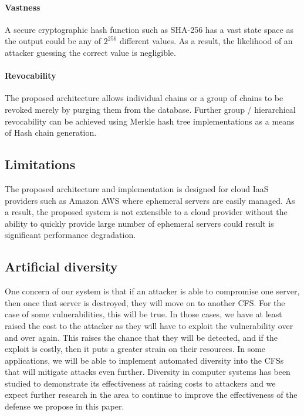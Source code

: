 \documentclass[a4paper,twoside]{article}
\begin{document}
\paragraph*{Vastness} A secure cryptographic hash function such as SHA-256 has a vast state space as the output could be any of $2^{256}$ different values.  As a result, the likelihood of an attacker guessing the correct value is negligible.

\paragraph*{Revocability} The proposed architecture allows individual chains or a group of chains to be revoked merely by purging them from the database. Further group / hierarchical revocability can be achieved using Merkle hash tree implementations as a means of Hash chain generation.

\subsection{Limitations}
The proposed architecture and implementation is designed for cloud IaaS providers such as Amazon AWS where ephemeral servers are easily managed.  As a result, the proposed system is not extensible to a cloud provider without the ability to quickly provide large number of ephemeral servers  could result is significant performance degradation.


\subsection{Artificial diversity}

One concern of our system is that if an attacker is able to compromise one server, then once that server is destroyed, they will move on to another CFS.  For the case of some vulnerabilities, this will be true.  In those cases, we have at least raised the cost to the attacker as they will have to exploit the vulnerability over and over again.  This raises the chance that they will be detected, and if the exploit is costly, then it puts a greater strain on their resources.  In some applications, we will be able to implement automated diversity into the CFSs that will mitigate attacks even further.  Diversity in computer systems \cite{forrest_building_1997, littlewood_redundancy_2004, cox_n-variant_2006} has been studied to demonstrate its effectiveness at raising costs to attackers and we expect further research in the area to continue to improve the effectiveness of the defense we propose in this paper.  
\end{document}
